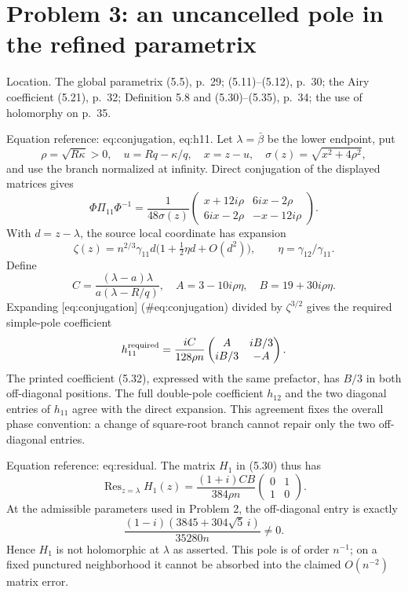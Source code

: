 \documentclass[10pt]{article}
\begin{document}
\section*{Problem 3: an uncancelled pole in the refined parametrix}
Location. The global parametrix (5.5), p. 29; (5.11)–(5.12), p. 30; the Airy coefficient (5.21), p. 32; Definition 5.8 and (5.30)–(5.35), p. 34; the use of holomorphy on p. 35.\par
Equation reference: eq:conjugation, eq:h11. Let \(\lambda=\bar\beta\) be the lower endpoint, put \[\rho=\sqrt{R\kappa}>0,\quad u=Rq-\kappa/q,\quad
 x=z-u,\quad \sigma(z)=\sqrt{x^2+4\rho^2},\] and use the branch normalized at infinity. Direct conjugation of the displayed matrices gives \[
 \Phi\Pi_{11}\Phi^{-1}
 =\frac1{48\sigma(z)}
 \begin{pmatrix}
 x+12i\rho&6ix-2\rho\\
 6ix-2\rho&-x-12i\rho
 \end{pmatrix}.\] With \(d=z-\lambda\), the source local coordinate has expansion \[\zeta(z)=n^{2/3}\gamma_{11}d
       \bigl(1+\tfrac12\eta d+O(d^2)\bigr),
 \qquad \eta=\gamma_{12}/\gamma_{11}.\] Define \[C=\frac{(\lambda-a)\lambda}{a(\lambda-R/q)},\quad
 A=3-10i\rho\eta,\quad B=19+30i\rho\eta .\] Expanding [eq:conjugation] (\#eq:conjugation) divided by \(\zeta^{3/2}\) gives the required simple-pole coefficient \[
 h_{11}^{\rm required}
 =\frac{iC}{128\rho n}
 \begin{pmatrix} A&iB/3\\ iB/3&-A\end{pmatrix}.\] The printed coefficient (5.32), expressed with the same prefactor, has \(B/3\) in both off-diagonal positions. The full double-pole coefficient \(h_{12}\) and the two diagonal entries of \(h_{11}\) agree with the direct expansion. This agreement fixes the overall phase convention: a change of square-root branch cannot repair only the two off-diagonal entries.\par
Equation reference: eq:residual. The matrix \(H_1\) in (5.30) thus has \[
 \operatorname{Res}_{z=\lambda}H_1(z)
 =\frac{(1+i)CB}{384\rho n}
 \begin{pmatrix}0&1\\1&0\end{pmatrix}.\] At the admissible parameters used in Problem 2, the off-diagonal entry is exactly \[\frac{(1-i)(3845+304\sqrt5\,i)}{35280n}\ne0 .\] Hence \(H_1\) is not holomorphic at \(\lambda\) as asserted. This pole is of order \(n^{-1}\); on a fixed punctured neighborhood it cannot be absorbed into the claimed \(O(n^{-2})\) matrix error.\par
\end{document}
